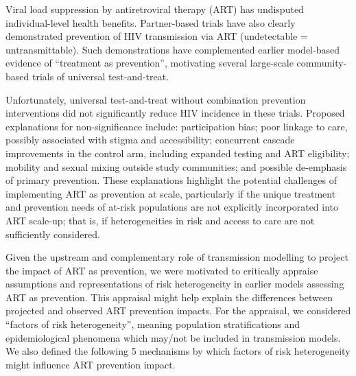 Viral load suppression by antiretroviral therapy (ART)
has undisputed individual-level health benefits.
\autocite{}
Partner-based trials have also clearly demonstrated
prevention of HIV transmission via ART (undetectable = untransmittable).
\cite{Lundgren2015,Danel2015,Cohen2016} %
Such demonstrations have complemented earlier model-based evidence of
``treatment as prevention'',\cite{Granich2009,Eaton2012} motivating
several large-scale community-based trials of universal test-and-treat.%
\cite{Havlir2019,Hayes2019,Iwuji2018}
\par
Unfortunately, universal test-and-treat without combination prevention interventions
did not significantly reduce HIV incidence in these trials.
\cite{Havlir2019,Hayes2019,Iwuji2018}
Proposed explanations for non-significance include:
participation bias;
poor linkage to care, possibly associated with stigma and accessibility;
concurrent cascade improvements in the control arm, including
expanded testing and ART eligibility;
mobility and sexual mixing outside study communities;
and possible de-emphasis of primary prevention.%
\cite{Havlir2019,Hayes2019,Iwuji2018,Baral2019}
These explanations highlight the potential challenges of
implementing ART as prevention at scale, particularly if
the unique treatment and prevention needs of at-risk populations
are not explicitly incorporated into ART scale-up;
that is, if heterogeneities in risk and access to care
are not sufficiently considered.
\cite{Baral2019}
\par
Given the upstream and complementary role of transmission modelling
to project the impact of ART as prevention,\cite{Granich2009,Eaton2012}
we were motivated to critically appraise
assumptions and representations of risk heterogeneity
in earlier models assessing ART as prevention.
This appraisal might help explain the differences between
projected and observed ART prevention impacts.
For the appraisal, we considered ``factors of risk heterogeneity'',
meaning population stratifications and epidemiological phenomena
which may/not be included in transmission models.
We also defined the following 5 mechanisms
by which factors of risk heterogeneity might influence ART prevention impact.
